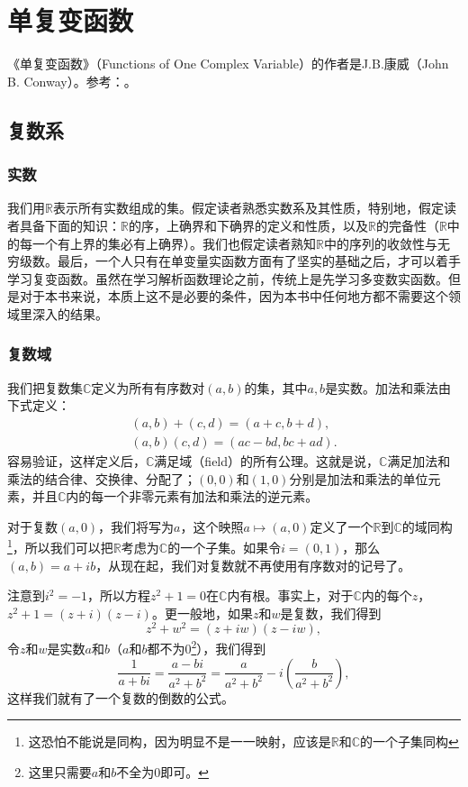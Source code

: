 \part{单复变函数}
《单复变函数》（Functions of One Complex Variable）的作者是J.B.康威（John B. Conway）。参考：\cite{FunctionsofOneComplexVariable1978}。

\chapter{复数系}\label{section00201}

\section{实数}\label{subsection0020101}
我们用$\mathbb{R}$表示所有实数组成的集。假定读者熟悉实数系及其性质，特别地，假定读者具备下面的知识：$\mathbb{R}$的序，上确界和下确界的定义和性质，以及$\mathbb{R}$的完备性（$\mathbb{R}$中的每一个有上界的集必有上确界）。我们也假定读者熟知$\mathbb{R}$中的序列的收敛性与无穷级数。最后，一个人只有在单变量实函数方面有了坚实的基础之后，才可以着手学习复变函数。虽然在学习解析函数理论之前，传统上是先学习多变数实函数。但是对于本书来说，本质上这不是必要的条件，因为本书中任何地方都不需要这个领域里深入的结果。

\section{复数域}\label{subsection0020102}
我们把复数集$\mathbb{C}$定义为所有有序数对$(a, b)$的集，其中$a,b$是实数。加法和乘法由下式定义：
\begin{gather*}
(a, b) + (c, d) = (a+c, b+d), \\
(a, b)(c, d) = (ac-bd, bc + ad).
\end{gather*}
容易验证，这样定义后，$\mathbb{C}$满足域（field）的所有公理。这就是说，$\mathbb{C}$满足加法和乘法的结合律、交换律、分配了；$(0, 0)$和$(1,0)$分别是加法和乘法的单位元素，并且$\mathbb{C}$内的每一个非零元素有加法和乘法的逆元素。

对于复数$(a, 0)$，我们将写为$a$，这个映照$a \mapsto (a, 0)$定义了一个$\mathbb{R}$到$\mathbb{C}$的域同构\footnote{这恐怕不能说是同构，因为明显不是一一映射，应该是$\mathbb{R}$和$\mathbb{C}$的一个子集同构}，所以我们可以把$\mathbb{R}$考虑为$\mathbb{C}$的一个子集。如果令$i=(0, 1)$，那么$(a, b) = a + ib$，从现在起，我们对复数就不再使用有序数对的记号了。

注意到$i^2=-1$，所以方程$z^2+1=0$在$\mathbb{C}$内有根。事实上，对于$\mathbb{C}$内的每个$z$，$z^2+1=(z+i)(z-i)$。更一般地，如果$z$和$w$是复数，我们得到
\[
z^2+w^2 = (z+iw)(z-iw),
\]
令$z$和$w$是实数$a$和$b$（$a$和$b$都不为0\footnote{这里只需要$a$和$b$不全为0即可。}），我们得到
\[
\frac{1}{a+bi} = \frac{a-bi}{a^2+b^2} = \frac{a}{a^2+b^2} - i(\frac{b}{a^2+b^2}),
\]
这样我们就有了一个复数的倒数的公式。

